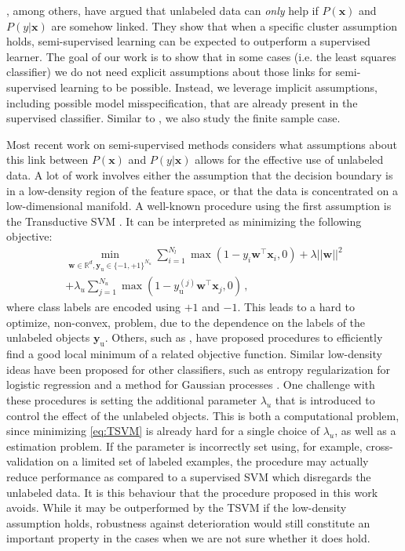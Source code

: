 \documentclass[twoside]{memoir}\usepackage[]{graphicx}\usepackage{xcolor}
\renewcommand{\vec}{\mathbf}
\begin{document}
\citet{Singh2008}, among others, have argued that unlabeled data can \emph{only} help if $P(\vec{x})$ and $P(y|\vec{x})$ are somehow linked. They show that when a specific cluster assumption holds, semi-supervised learning can be expected to outperform a supervised learner. The goal of our work is to show that in some cases (i.e. the least squares classifier) we do not need explicit assumptions about those links for semi-supervised learning to be possible. Instead, we leverage implicit assumptions, including possible model misspecification, that are already present in the supervised classifier. Similar to \citet{Singh2008}, we also study the finite sample case.

Most recent work on semi-supervised methods considers what assumptions about this link between $P(\vec{x})$ and $P(y|\vec{x})$ allows for the effective use of unlabeled data. A lot of work involves either the assumption that the decision boundary is in a low-density region of the feature space, or that the data is concentrated on a low-dimensional manifold. A well-known procedure using the first assumption is the Transductive SVM \citep{Joachims1999}. It can be interpreted as minimizing the following objective:
\begin{multline}
\label{eq:TSVM}
\min_{\vec{w} \in \mathbb{R}^d,\vec{y}_\text{u} \in \{-1,+1\}^{N_u}} \sum_{i=1}^{N_l} \max(1-y_i \vec{w}^\top \vec{x}_i,0) + \lambda ||\vec{w}||^2 \\ + \lambda_u \sum_{j=1}^{N_u} \max(1-y_\text{u}^{(j)} \vec{w}^\top \vec{x}_j,0) \,,
\end{multline}
where class labels are encoded using $+1$ and $-1$. This leads to a hard to optimize, non-convex, problem, due to the dependence on the labels of the unlabeled objects $\vec{y}_\text{u}$. Others, such as \citet{Sindhwani2006}, have proposed procedures to efficiently find a good local minimum of a related objective function. Similar low-density ideas have been proposed for other classifiers, such as entropy regularization for logistic regression \citep{Grandvalet2005} and a method for Gaussian processes \citep{Lawrence2004}. One challenge with these procedures is setting the additional parameter $\lambda_u$ that is introduced to control the effect of the unlabeled objects. This is both a computational problem, since minimizing \eqref{eq:TSVM} is already hard for a single choice of $\lambda_u$, as well as a estimation problem. If the parameter is incorrectly set using, for example, cross-validation on a limited set of labeled examples, the procedure may actually reduce performance as compared to a supervised SVM which disregards the unlabeled data. It is this behaviour that the procedure proposed in this work avoids. While it may be outperformed by the TSVM if the low-density assumption holds, robustness against deterioration would still constitute an important property in the cases when we are not sure whether it does hold.
\end{document}
